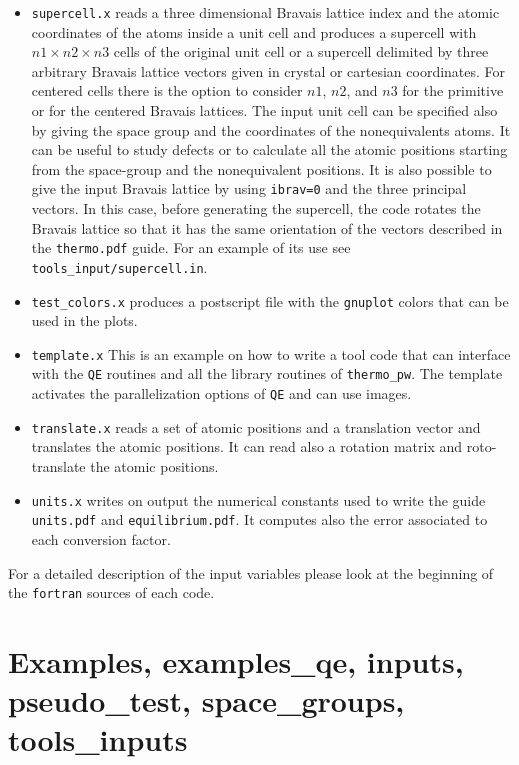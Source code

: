 \documentclass[12pt,a4paper,twoside]{report}
\begin{document}
\begin{itemize}
\item \texttt{supercell.x} reads a three dimensional
Bravais lattice index and the atomic coordinates of the atoms inside a unit
cell and produces a supercell with $n1 \times n2 \times n3$ cells of 
the original
unit cell or a supercell delimited by three arbitrary Bravais lattice
vectors given in crystal or cartesian coordinates. For centered cells 
there is the option to consider $n1$, $n2$,
and $n3$ for the primitive or for the centered Bravais lattices.
The input unit cell can be specified also by giving the space group and
the coordinates of the nonequivalents atoms.
It can be useful to study defects or to calculate all the 
atomic positions starting from the space-group and the 
nonequivalent positions.
It is also possible to give the input Bravais lattice by using
\texttt{ibrav=0} and the three principal vectors. In this case,
before generating the supercell, the code rotates the Bravais
lattice so that it has the same orientation of the vectors described
in the \texttt{thermo.pdf} guide.
For an example of its use see \texttt{tools\_input/supercell.in}.

\item \texttt{test\_colors.x} produces a postscript file with the 
\texttt{gnuplot} colors that can be used in the plots.   

\item \texttt{template.x} This is an example on how to write a tool
code that can interface with the \texttt{QE} routines and all the
library routines of \texttt{thermo\_pw}. The template activates 
the parallelization options of \texttt{QE} and can use images.

\item \texttt{translate.x} reads a set of atomic positions and a translation
vector and translates the atomic positions. It can read also a rotation matrix 
and roto-translate the atomic positions.

\item \texttt{units.x} writes on output the numerical constants used
to write the guide \texttt{units.pdf} and \texttt{equilibrium.pdf}. 
It computes also the error associated to each conversion factor.

\end{itemize}

For a detailed description of the input variables please look at the beginning 
of the \texttt{fortran} sources of each code.

\newpage
{\color{dark-blue}\chapter{Examples, examples\_qe, inputs, pseudo\_test, space\_groups, \\ tools\_inputs}}
\color{black}
\end{document}
